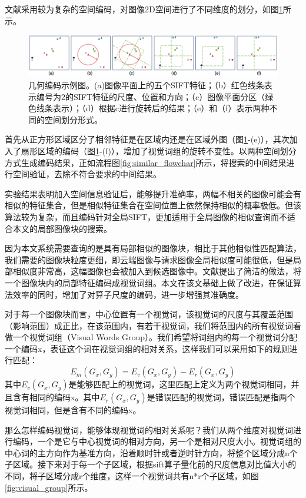 文献\cite{Zhou:2013jz}采用较为复杂的空间编码，对图像2D空间进行了不同维度的划分，如图\ref{fig:geo_coding}所示。
\begin{figure}
\centering\includegraphics[width=15cm]{imgs/ch3/geo_coding}
\caption{几何编码示例图。(a)图像平面上的五个SIFT特征；（b）红色线条表示编号为2的SIFT特征的尺度、位置和方向；（c）图像平面分区（绿色线条表示）；（d）根据c进行旋转后的结果；（e）和（f）表示两种不同的空间划分形式。}
\label{fig:geo_coding}
\end{figure}
首先从正方形区域区分了相邻特征是在区域内还是在区域外图（图\ref{fig:geo_coding}-(e)），其次加入了扇形区域的编码（图\ref{fig:geo_coding}-(f)），增加了视觉词组的旋转不变性。以两种空间划分方式生成编码结果，正如流程图\ref{fig:similar_flowchar}所示，将搜索的中间结果进行空间验证，去除不符合要求的中间结果。

实验结果表明加入空间信息验证后，能够提升准确率，两幅不相关的图像可能会有相似的特征集合，但是相似特征集合在空间位置上依然保持相似的概率极低。但该算法较为复杂，而且编码针对全局SIFT，更加适用于全局图像的相似查询而不适合本文的局部图像块的搜索。

因为本文系统需要查询的是具有局部相似的图像块，相比于其他相似性匹配算法，我们需要的图像块粒度更细，即云端图像与请求图像全局相似度可能很低，但是局部相似度非常高，这幅图像也会被加入到候选图像中。文献\cite{Dai:2012vn}提出了简洁的做法，将一个图像块内的局部特征编码成视觉词组。本文在该文基础上做了改进，在保证算法效率的同时，增加了对算子尺度的编码，进一步增强其准确度。

对于每一个图像块而言，中心位置有一个视觉词，该视觉词的尺度与其覆盖范围（影响范围）成正比，在该范围内，有若干视觉词，我们将范围内的所有视觉词看做一个视觉词组（Visual Words Group）。我们希望将词组内的每一个视觉词分配一个编码x，表征这个词在视觉词组的相对关系，这样我们可以采用如下的规则进行匹配：
\begin{equation}
E_m(G_x,G_y) = E_v(G_x,G_y) - E_r(G_x,G_y)
\end{equation}
其中\(E_v(G_x,G_y)\)是能够匹配上的视觉词，这里匹配上定义为两个视觉词相同，并且含有相同的编码x。其中\(E_r(G_x,G_y)\)是错误匹配的视觉词，错误匹配是指两个视觉词相同，但是含有不同的编码x。

那么怎样编码视觉词，能够体现视觉词的相对关系呢？我们从两个维度对视觉词进行编码，一个是它与中心视觉词的相对方向，另一个是相对尺度大小。视觉词组的中心词的主方向作为基准方向，沿着顺时针或者逆时针方向，将整个区域分成n个子区域。接下来对于每一个子区域，根据sift算子量化前的尺度信息对比值大小的不同，将子区域分成r个维度，这样一个视觉词共有n*r个子区域，如图\ref{fig:visual_group}所示。

